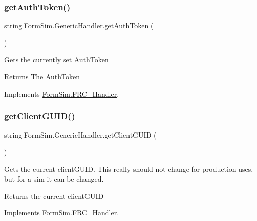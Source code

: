 \subsubsection{\texorpdfstring{get\+Auth\+Token()}{getAuthToken()}}
{\footnotesize\ttfamily string Form\+Sim.\+Generic\+Handler.\+get\+Auth\+Token (\begin{DoxyParamCaption}{ }\end{DoxyParamCaption})\hspace{0.3cm}{\ttfamily [inline]}}



Gets the currently set Auth\+Token 

\begin{DoxyReturn}{Returns}
The Auth\+Token
\end{DoxyReturn}


Implements \mbox{\hyperlink{interface_form_sim_1_1_f_r_c___handler_aeebaee9e36c649daae23db9fc710b261}{Form\+Sim.\+F\+R\+C\+\_\+\+Handler}}.

\mbox{\label{class_form_sim_1_1_generic_handler_a16fe6657ef9d508f46dae9c8883a3a07}} 
\subsubsection{\texorpdfstring{get\+Client\+G\+U\+I\+D()}{getClientGUID()}}
{\footnotesize\ttfamily string Form\+Sim.\+Generic\+Handler.\+get\+Client\+G\+U\+ID (\begin{DoxyParamCaption}{ }\end{DoxyParamCaption})\hspace{0.3cm}{\ttfamily [inline]}}



Gets the current client\+G\+U\+ID. This really should not change for production uses, but for a sim it can be changed. 

\begin{DoxyReturn}{Returns}
the current client\+G\+U\+ID
\end{DoxyReturn}


Implements \mbox{\hyperlink{interface_form_sim_1_1_f_r_c___handler_a66f72d339aebc7c5b434026953a79044}{Form\+Sim.\+F\+R\+C\+\_\+\+Handler}}.

\mbox{\label{class_form_sim_1_1_generic_handler_ab567abdefd58e1fcb3006861c741961c}} 
